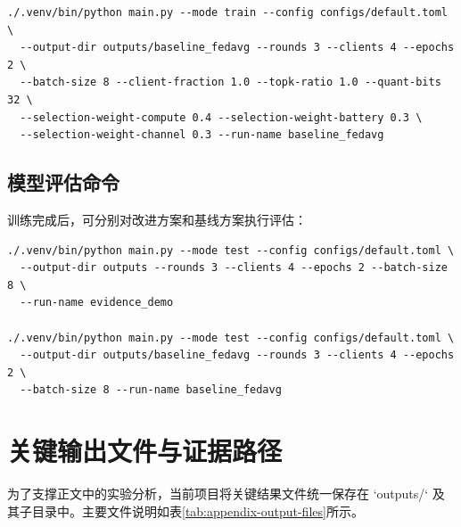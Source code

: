 \begin{verbatim}
./.venv/bin/python main.py --mode train --config configs/default.toml \
  --output-dir outputs/baseline_fedavg --rounds 3 --clients 4 --epochs 2 \
  --batch-size 8 --client-fraction 1.0 --topk-ratio 1.0 --quant-bits 32 \
  --selection-weight-compute 0.4 --selection-weight-battery 0.3 \
  --selection-weight-channel 0.3 --run-name baseline_fedavg
\end{verbatim}

\subsection{模型评估命令}

训练完成后，可分别对改进方案和基线方案执行评估：

\begin{verbatim}
./.venv/bin/python main.py --mode test --config configs/default.toml \
  --output-dir outputs --rounds 3 --clients 4 --epochs 2 --batch-size 8 \
  --run-name evidence_demo

./.venv/bin/python main.py --mode test --config configs/default.toml \
  --output-dir outputs/baseline_fedavg --rounds 3 --clients 4 --epochs 2 \
  --batch-size 8 --run-name baseline_fedavg
\end{verbatim}

\section{关键输出文件与证据路径}
\label{app:output-files}

为了支撑正文中的实验分析，当前项目将关键结果文件统一保存在 `outputs/` 及其子目录中。主要文件说明如表\ref{tab:appendix-output-files}所示。

